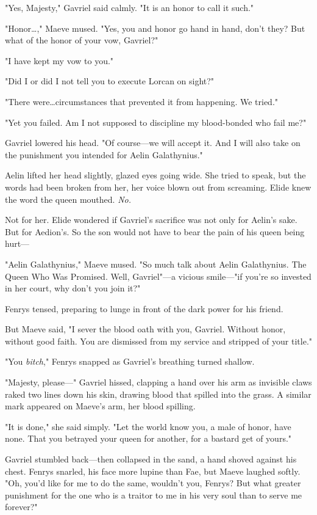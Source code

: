 "Yes, Majesty," Gavriel said calmly.
"It is an honor to call it such."

"Honor\ldots ," Maeve mused.
"Yes, you and honor go hand in hand, don't they?
But what of the honor of your vow, Gavriel?"

"I have kept my vow to you."

"Did I or did I not tell you to execute Lorcan on sight?"

"There were\ldots circumstances that prevented it from happening.
We tried."

"Yet you failed.
Am I not supposed to discipline my blood-bonded who fail me?"

Gavriel lowered his head.
"Of course---we will accept it.
And I will also take on the punishment you intended for Aelin Galathynius."

Aelin lifted her head slightly, glazed eyes going wide.
She tried to speak, but the words had been broken from her, her voice blown out from screaming.
Elide knew the word the queen mouthed.
\emph{No.}

Not for her.
Elide wondered if Gavriel's sacrifice was not only for Aelin's sake.
But for Aedion's.
So the son would not have to bear the pain of his queen being hurt---

"Aelin Galathynius," Maeve mused.
"So much talk about Aelin Galathynius.
The Queen Who Was Promised.
Well, Gavriel"---a vicious smile---"if you're so invested in her court, why don't you join it?"

Fenrys tensed, preparing to lunge in front of the dark power for his friend.

But Maeve said, "I sever the blood oath with you, Gavriel.
Without honor, without good faith.
You are dismissed from my service and stripped of your title."

"You \emph{bitch}," Fenrys snapped as Gavriel's breathing turned shallow.

"Majesty, please---" Gavriel hissed, clapping a hand over his arm as invisible claws raked two lines down his skin, drawing blood that spilled into the grass.
A similar mark appeared on Maeve's arm, her blood spilling.

"It is done," she said simply.
"Let the world know you, a male of honor, have none.
That you betrayed your queen for another, for a bastard get of yours."

Gavriel stumbled back---then collapsed in the sand, a hand shoved against his chest.
Fenrys snarled, his face more lupine than Fae, but Maeve laughed softly.
"Oh, you'd like for me to do the same, wouldn't you, Fenrys?
But what greater punishment for the one who is a traitor to me in his very soul than to serve me forever?"

